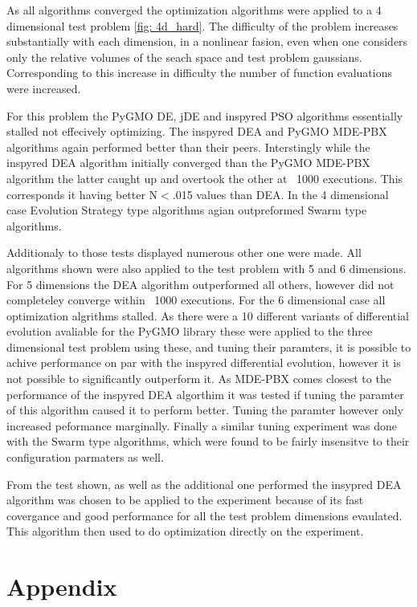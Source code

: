 \documentclass[a4paper,titlepage]{report}
\begin{document}
As all algorithms converged the optimization algorithms were applied to a 4 dimensional test problem \ref{fig: 4d_hard}. The difficulty of the problem increases substantially with each dimension, in a nonlinear fasion, even when one considers only the relative volumes of the seach space and test problem gaussians. Corresponding to this increase in difficulty the number of function evaluations were increased.

For this problem the PyGMO DE, jDE and inspyred PSO algorithms essentially stalled not effecively optimizing. The inspyred DEA and PyGMO MDE-PBX algorithms again performed better than their peers. Interstingly while the inspyred DEA algorithm initially converged than the PyGMO MDE-PBX algorithm the latter caught up and overtook the other at ~1000 executions. This corresponds it having better N$<$.015 values than DEA. In the 4 dimensional case Evolution Strategy type algorithms agian outpreformed Swarm type algorithms.

Additionaly to those tests displayed numerous other one were made. All algorithms shown were also applied to the test problem with 5 and 6 dimensions. For 5 dimensions the DEA algorithm outperformed all others, however did not completeley converge within ~1000 executions. For the 6 dimensional case all optimization algrithms stalled. As there were a 10 different variants of differential evolution avaliable for the PyGMO library these were applied to the three dimensional test problem using these, and tuning their paramters, it is possible to achive performance on par with the inspyred differential evolution, however it is not possible to significantly outperform it. As MDE-PBX comes closest to the performance of the inspyred DEA algorthim it was tested if tuning the paramter of this algorithm caused it to perform better. Tuning the paramter however only increased peformance marginally. Finally a similar tuning experiment was done with the Swarm type algorithms, which were found to be fairly insensitve to their configuration parmaters as well.

From the test shown, as well as the additional one performed the insypred DEA algorithm was chosen to be applied to the experiment because of its fast covergance and good performance for all the test problem dimensions evaulated. This algorithm then used to do optimization directly on the experiment.

\chapter{Appendix}
\end{document}
